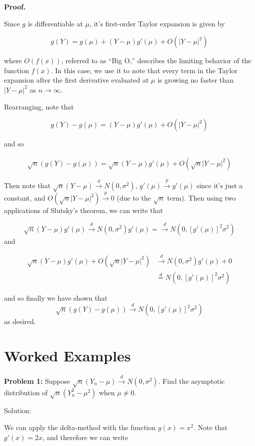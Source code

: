 \documentclass[
  letterpaper,
  DIV=11,
  numbers=noendperiod]{scrreprt}
\begin{document}
\textbf{Proof.}

Since \(g\) is differentiable at \(\mu\), it's first-order Taylor
expansion is given by

\[
g(Y) = g(\mu) + (Y - \mu)g'(\mu) + O(| Y - \mu |^2)
\]

where \(O(f(x))\), referred to as ``Big O,'' describes the limiting
behavior of the function \(f(x)\). In this case, we use it to note that
every term in the Taylor expansion after the first derivative evaluated
at \(\mu\) is growing no faster than \(|Y - \mu|^2\) as
\(n \to \infty\).

Rearranging, note that

\[
g(Y) - g(\mu) =  (Y - \mu)g'(\mu) + O(| Y - \mu |^2)
\]

and so

\begin{align*}
    \sqrt{n}\left( g(Y) - g(\mu) \right) = \sqrt{n}(Y - \mu) g'(\mu) + O(\sqrt{n} |Y - \mu|^2)
\end{align*}

Then note that \(\sqrt{n}(Y - \mu) \overset{d}{\to} N(0, \sigma^2)\),
\(g'(\mu) \overset{p}{\to} g'(\mu)\) since it's just a constant, and
\(O(\sqrt{n} |Y - \mu|^2) \overset{p}{\to} 0\) (due to the \(\sqrt{n}\)
term). Then using two applications of Slutsky's theorem, we can write
that

\[
\sqrt{n}(Y - \mu)g'(\mu) \overset{d}{\to} N(0, \sigma^2)g'(\mu) = \overset{d}{\to} N(0, [g'(\mu)]^2\sigma^2)
\] and

\begin{align*}
    \sqrt{n}(Y - \mu)g'(\mu) + O(\sqrt{n} |Y - \mu|^2) & \overset{d}{\to} N(0, \sigma^2)g'(\mu) + 0\\
    & \overset{d}{=} N(0, [g'(\mu)]^2\sigma^2) 
\end{align*}

and so finally we have shown that \[
\sqrt{n}\left( g(Y) - g(\mu) \right) \overset{d}{\to}  N(0, [g'(\mu)]^2\sigma^2)
\] as desired.

\section{Worked Examples}\label{worked-examples-5}

\textbf{Problem 1:} Suppose
\(\sqrt{n}(Y_n - \mu) \overset{d}{\to} N(0, \sigma^2)\). Find the
asymptotic distribution of \(\sqrt{n}(Y_n^2 - \mu^2)\) when
\(\mu \neq 0\).

Solution:

We can apply the delta-method with the function \(g(x) = x^2\). Note
that \(g'(x) = 2x\), and therefore we can write
\end{document}
